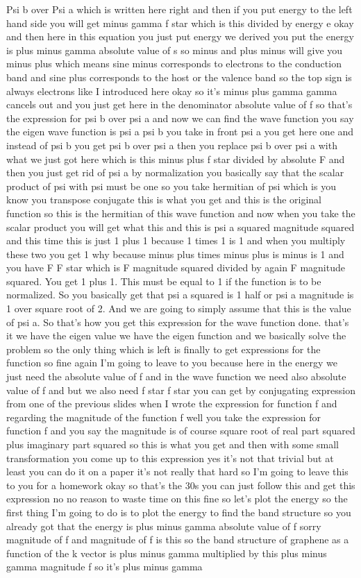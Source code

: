 Psi b over Psi a which is written here right and then if you put energy to the left hand side you will get minus gamma f star which is this divided by energy e okay and then here in this equation you just put energy we derived you put the energy is plus minus gamma absolute value of s so minus and plus minus will give you minus plus which means sine minus corresponds to electrons to the conduction band and sine plus corresponds to the host or the valence band so the top sign is always electrons like I introduced here okay so it's minus plus gamma gamma cancels out and you just get here in the denominator absolute value of f so that's the expression for psi b over psi a and now we can find the wave function you say the eigen wave function is psi a psi b you take in front psi a you get here one and instead of psi b you get psi b over psi a then you replace psi b over psi a with what we just got here which is this minus plus f star divided by absolute F and then you just get rid of psi a by normalization you basically say that the scalar product of psi with psi must be one so you take hermitian of psi which is you know you transpose conjugate this is what you get and this is the original function so this is the hermitian of this wave function and now when you take the scalar product you will get what this and this is psi a squared magnitude squared and this time this is just 1 plus 1 because 1 times 1 is 1 and when you multiply these two you get 1 why because minus plus times minus plus is minus is 1 and you have F F star which is F magnitude squared divided by again F magnitude squared. You get 1 plus 1. This must be equal to 1 if the function is to be normalized. So you basically get that psi a squared is 1 half or psi a magnitude is 1 over square root of 2. And we are going to simply assume that this is the value of psi a. So that's how you get this expression for the wave function done. that's it we have the eigen value we have the eigen function and we basically solve the problem so the only thing which is left is finally to get expressions for the function so fine again I'm going to leave to you because here in the energy we just need the absolute value of f and in the wave function we need also absolute value of f and but we also need f star f star you can get by conjugating expression from one of the previous slides when I wrote the expression for function f and regarding the magnitude of the function f well you take the expression for function f and you say the magnitude is of course square root of real part squared plus imaginary part squared so this is what you get and then with some small transformation you come up to this expression yes it's not that trivial but at least you can do it on a paper it's not really that hard so I'm going to leave this to you for a homework okay so that's the 30s you can just follow this and get this expression no no reason to waste time on this fine so let's plot the energy so the first thing I'm going to do is to plot the energy to find the band structure so you already got that the energy is plus minus gamma absolute value of f sorry magnitude of f and magnitude of f is this so the band structure of graphene as a function of the k vector is plus minus gamma multiplied by this plus minus gamma magnitude f so it's plus minus gamma 